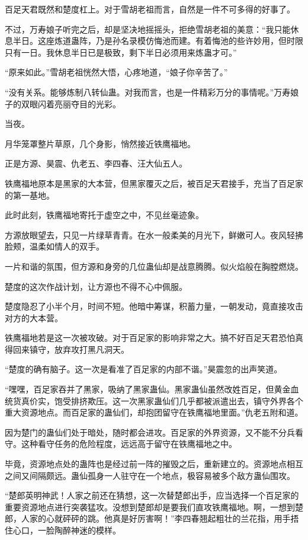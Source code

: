 \begin{this_body}
百足天君既然和楚度杠上。对于雪胡老祖而言，自然是一件不可多得的好事了。

不过，万寿娘子听完之后，却是坚决地摇摇头，拒绝雪胡老祖的美意：“我只能休息半日。这座炼道蛊阵，乃是孙名录模仿悔池而建。有着悔池的些许妙用，但时限只有一日。我休息半日已是极致，剩下半日必须用来炼蛊才可。”

“原来如此。”雪胡老祖恍然大悟，心疼地道，“娘子你辛苦了。”

“没有关系。能够炼制八转仙蛊。对我而言，也是一件精彩万分的事情呢。”万寿娘子的双眼闪着亮丽夺目的光彩。

当夜。

月华笼罩整片草原，几个身影，悄然接近铁鹰福地。

正是方源、昊震、仇老五、李四春、汪大仙五人。

铁鹰福地原本是黑家的大本营，但黑家覆灭之后，被百足天君接手，充当了百足家的第一基地。

此时此刻，铁鹰福地寄托于虚空之中，不见丝毫迹象。

方源放眼望去，只见一片绿草青青。在水一般柔美的月光下，鲜嫩可人。夜风轻拂脸颊，温柔如情人的双手。

一片和谐的氛围，但方源和身旁的几位蛊仙却是战意腾腾。似火焰般在胸膛燃烧。

楚度的这次作战计划，让方源也不得不心中佩服。

楚度隐忍了小半个月，时间不短。他暗中筹谋，积蓄力量，一朝发动，竟直接攻击对方的大本营。

铁鹰福地若是这一次被攻破。对于百足家的影响非常之大。搞不好百足天君恐怕真得回来镇守，放弃攻打黑凡洞天。

“楚度的确有脑子。这一次是看准了百足家的内部不谐。”昊震忽的出声笑道。

“嘿嘿，百足家吞并了黑家，吸纳了黑家蛊仙。黑家蛊仙虽然改姓百足，但黄金血统货真价实，饱受排挤欺压。这一次黑家蛊仙们几乎都被派遣出去，镇守外界各个重大资源地点。而百足家的蛊仙们，却抱团留守在铁鹰福地里面。”仇老五附和道。

因为楚门的蛊仙们处于暗处，随时都会进攻。百足家的外界资源，又不能不分兵看守。这种看守任务的危险程度，远远高于留守在铁鹰福地之中。

毕竟，资源地点处的蛊阵也是经过前一阵的摧毁之后，重新建立的。资源地点相互之间又间隔颇远。蛊仙孤身一人驻守在一个地点，极容易被多个敌方蛊仙围攻。

“楚郎英明神武！人家之前还在猜想，这一次替楚郎出手，应当选择一个百足家的重要资源地点进行突袭猛攻。没想到楚郎却是要我们直攻铁鹰福地。啊，一想到楚郎，人家的心就砰砰的跳。他真是好厉害啊！”李四春翘起粗壮的兰花指，用手捂住心口，一脸陶醉神迷的模样。


\end{this_body}
